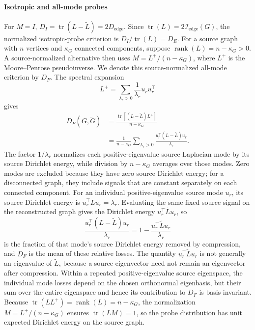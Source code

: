 \paragraph{Isotropic and all-mode probes}
For $M=I$, $D_I=\operatorname{tr}(L-\widetilde L)=2D_{\mathrm{edge}}$.
Since $\operatorname{tr}(L)=2\mathcal I_{\mathrm{edge}}(G)$, the normalized isotropic-probe criterion is $D_I/\operatorname{tr}(L)=D_E$.
For a source graph with $n$ vertices and $\kappa_G$ connected components, suppose $\operatorname{rank}(L)=n-\kappa_G>0$.
A source-normalized alternative then uses $M=L^+/(n-\kappa_G)$, where $L^+$ is the Moore--Penrose pseudoinverse.
We denote this source-normalized all-mode criterion by $D_F$.
The spectral expansion
\[
L^+
=
\sum_{\lambda_r>0}\frac1{\lambda_r}u_ru_r^\top
\]
gives
\begin{align}
D_F(G,\widetilde G)
&=\frac{\operatorname{tr}[(L-\widetilde L)L^+]}{n-\kappa_G}\\
&=\frac1{n-\kappa_G}
\sum_{\lambda_r>0}
\frac{u_r^\top(L-\widetilde L)u_r}{\lambda_r}.
\label{eq:source-normalized-dirichlet-distortion}
\end{align}
The factor $1/\lambda_r$ normalizes each positive-eigenvalue source Laplacian mode by its source Dirichlet energy, while division by $n-\kappa_G$ averages over those modes.
Zero modes are excluded because they have zero source Dirichlet energy; for a disconnected graph, they include signals that are constant separately on each connected component.
For an individual positive-eigenvalue source mode $u_r$, its source Dirichlet energy is $u_r^\top Lu_r=\lambda_r$.
Evaluating the same fixed source signal on the reconstructed graph gives the Dirichlet energy $u_r^\top\widetilde Lu_r$, so
\[
\frac{u_r^\top(L-\widetilde L)u_r}{\lambda_r}
=1-\frac{u_r^\top\widetilde Lu_r}{\lambda_r}
\]
is the fraction of that mode's source Dirichlet energy removed by compression, and $D_F$ is the mean of these relative losses.
The quantity $u_r^\top\widetilde Lu_r$ is not generally an eigenvalue of $\widetilde L$, because a source eigenvector need not remain an eigenvector after compression.
Within a repeated positive-eigenvalue source eigenspace, the individual mode losses depend on the chosen orthonormal eigenbasis, but their sum over the entire eigenspace and hence its contribution to $D_F$ is basis invariant.
Because $\operatorname{tr}(LL^+)=\operatorname{rank}(L)=n-\kappa_G$, the normalization $M=L^+/(n-\kappa_G)$ ensures $\operatorname{tr}(LM)=1$, so the probe distribution has unit expected Dirichlet energy on the source graph.

